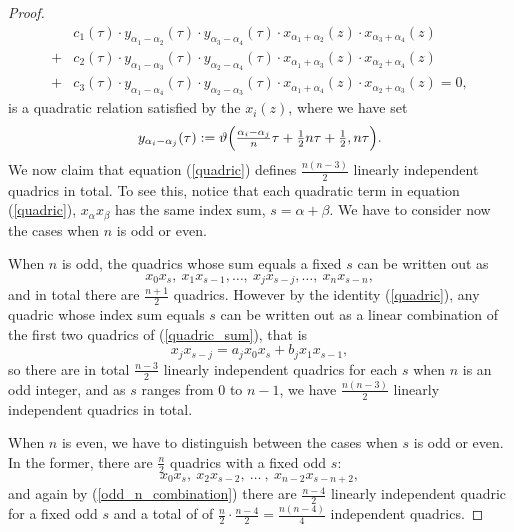 \begin{proof}
	\begin{equation}
	\label{quadric}
	\begin{split}
	&c_{1}(\tau)\cdot y_{\alpha_{1} - \alpha_{2}}(\tau)\cdot y_{\alpha_{3} - {\alpha_{4}}}(\tau)\cdot x_{\alpha_{1} + \alpha_{2}}(z)\cdot x_{\alpha_{3} + \alpha_{4}}(z)\\
	+& c_{2}(\tau)\cdot y_{\alpha_{1} - \alpha_{3}}(\tau)\cdot y_{\alpha_{2} - {\alpha_{4}}}(\tau)\cdot x_{\alpha_{1} + \alpha_{3}}(z)\cdot x_{\alpha_{2} + \alpha_{4}}(z)\\
	+&c_{3}(\tau) \cdot y_{\alpha_{1} - \alpha_{4}}(\tau)\cdot y_{\alpha_{2} - {\alpha_{3}}}(\tau)\cdot x_{\alpha_{1} +\alpha_{4}}(z)\cdot x_{\alpha_{2}+\alpha_{3}}(z) = 0,
	\end{split}
	\end{equation}
	is a quadratic relation satisfied by the $x_{i}(z)$, where we have set
	\begin{equation}
		\label{modular_coefficients}
		y_{\alpha_{i} - \alpha_{j}}(\tau) := \vartheta\Big(\tfrac{\alpha_{i} - \alpha_{j}}{n}\tau + \tfrac{1}{2}n\tau + \tfrac{1}{2},n\tau\Big).
	\end{equation}	
	We now claim that equation (\ref{quadric}) defines $\tfrac{n(n-3)}{2}$ linearly independent quadrics in total. To see this, notice that each quadratic term in equation (\ref{quadric}), $x_{\alpha}x_{\beta}$ has the same index sum, $s = \alpha + \beta$. We have to consider now the cases when $n$ is odd or even.
	
	When $n$ is odd, the quadrics whose sum equals a fixed $s$ can be written out as
	\begin{equation}
		\label{quadric_sum}
		x_{0}x_{s},\ x_{1}x_{s-1},\ldots,\ x_{j}x_{s-j},\ldots,\ x_{n}x_{s-n},
	\end{equation}
	and in total there are $\tfrac{n+1}{2}$ quadrics. However by the identity (\ref{quadric}), any quadric whose index sum equals $s$ can be written out as a linear combination of the first two quadrics of (\ref{quadric_sum}), that is
	\begin{equation}
	\label{odd_n_combination}
		x_{j}x_{s-j} = a_{j}x_{0}x_{s} + b_{j}x_{1}x_{s-1},
	\end{equation} 
	so there are in total $\tfrac{n-3}{2}$ linearly independent quadrics for each $s$ when $n$ is an odd integer, and as $s$ ranges from 0 to $n-1$, we have $\tfrac{n(n-3)}{2}$ linearly independent quadrics in total.
	
	When $n$ is even, we have to distinguish between the cases when $s$ is odd or even. In the former, there are $\tfrac{n}{2}$ quadrics with a fixed odd $s$:
	\begin{equation*}
		x_{0}x_{s},\ x_{2}x_{s-2},\ \ldots\ ,\ x_{n-2}x_{s-n+2},
	\end{equation*}
	and again by (\ref{odd_n_combination}) there are $\tfrac{n-4}{2}$ linearly independent quadric for a fixed odd $s$ and a total of of $\tfrac{n}{2}\cdot{\tfrac{n-4}{2}} = \tfrac{n(n-4)}{4}$ independent quadrics.
	

\end{proof}
